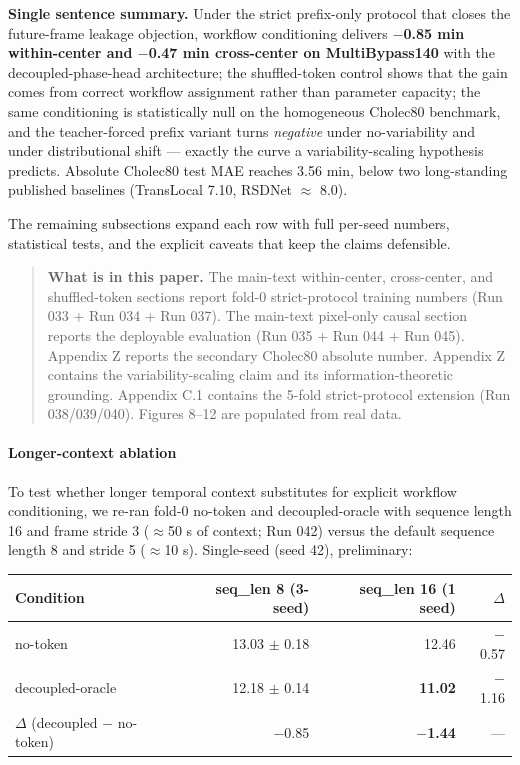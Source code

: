 \textbf{Single sentence summary.} Under the strict prefix-only protocol
that closes the future-frame leakage objection, workflow conditioning
delivers \textbf{$-$0.85 min within-center and $-$0.47 min cross-center on
MultiBypass140} with the decoupled-phase-head architecture; the
shuffled-token control shows that the gain comes from correct workflow
assignment rather than parameter capacity; the same conditioning is statistically null on
the homogeneous Cholec80 benchmark, and the teacher-forced prefix
variant turns \emph{negative} under no-variability and under
distributional shift --- exactly the curve a variability-scaling
hypothesis predicts. Absolute Cholec80 test MAE reaches 3.56 min, below
two long-standing published baselines (TransLocal 7.10, RSDNet $\approx$ 8.0).

The remaining subsections expand each row with full per-seed numbers,
statistical tests, and the explicit caveats that keep the claims
defensible.

\begin{quote}
\textbf{What is in this paper.} The main-text within-center, cross-center, and shuffled-token sections report fold-0
strict-protocol training numbers (Run 033 + Run 034 + Run 037). The main-text pixel-only causal section
reports the deployable evaluation (Run 035 + Run 044 +
Run 045). Appendix Z reports the secondary Cholec80 absolute number.
Appendix Z contains the variability-scaling claim and its
information-theoretic grounding. Appendix C.1 contains the 5-fold
strict-protocol extension (Run 038/039/040). Figures 8--12 are populated
from real data.
\end{quote}

\paragraph{Longer-context ablation}\label{longer-context-ablation}

To test whether longer temporal context substitutes for explicit
workflow conditioning, we re-ran fold-0 no-token and decoupled-oracle
with sequence length 16 and frame stride 3 ($\approx$50 s of context; Run 042)
versus the default sequence length 8 and stride 5 ($\approx$10 s). Single-seed
(seed 42), preliminary:

\begin{longtable}[]{@{}lrrr@{}}
\toprule\noalign{}
Condition & seq\_len 8 (3-seed) & seq\_len 16 (1 seed) & $\Delta$ \\
\midrule\noalign{}
\endhead
\bottomrule\noalign{}
\endlastfoot
no-token & 13.03 $\pm$ 0.18 & 12.46 & $-$0.57 \\
decoupled-oracle & 12.18 $\pm$ 0.14 & \textbf{11.02} & $-$1.16 \\
$\Delta$ (decoupled $-$ no-token) & $-$0.85 & \textbf{$-$1.44} & --- \\
\end{longtable}

